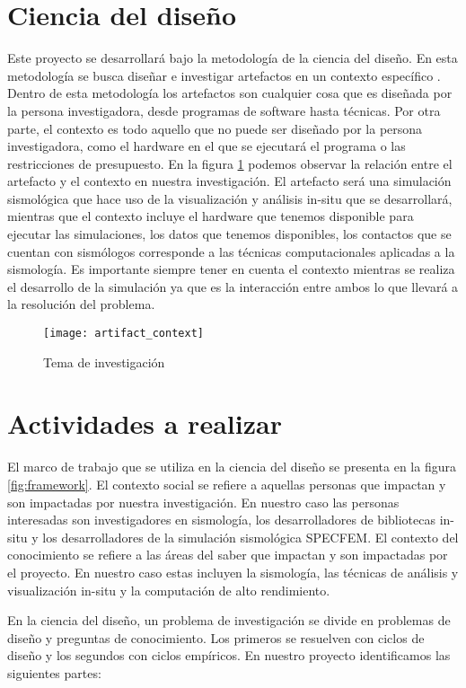 \section{Ciencia del diseño}
Este proyecto se desarrollará bajo la metodología de la ciencia del diseño. En esta metodología se busca diseñar e investigar artefactos en un contexto específico \cite{wieringa_design_2014}. Dentro de esta metodología los artefactos son cualquier cosa que es diseñada por la persona investigadora, desde programas de software hasta técnicas. Por otra parte, el contexto es todo aquello que no puede ser diseñado por la persona investigadora, como el hardware en el que se ejecutará el programa o las restricciones de presupuesto.
En la figura \ref{fig:artifact} podemos observar la relación entre el artefacto y el contexto en nuestra investigación. El artefacto será una simulación sismológica que hace uso de la visualización y análisis in-situ que se desarrollará, mientras que el contexto incluye el hardware que tenemos disponible para ejecutar las simulaciones, los datos que tenemos disponibles, los contactos que se cuentan con sismólogos corresponde a las técnicas computacionales aplicadas a la sismología. Es importante siempre tener en cuenta el contexto mientras se realiza el desarrollo de la simulación ya que es la interacción entre ambos lo que llevará a la resolución del problema.
\begin{figure}
  \centering
  \texttt{[image: artifact\_context]}
  \caption{Tema de investigación}
  \label{fig:artifact}
\end{figure}

\section{Actividades a realizar}
\label{sec:activities}

El marco de trabajo que se utiliza en la ciencia del diseño se presenta en la figura \ref{fig:framework}. El contexto social se refiere a aquellas personas que impactan y son impactadas por nuestra investigación. En nuestro caso las personas interesadas son investigadores en sismología, los desarrolladores de bibliotecas in-situ y los desarrolladores de la simulación sismológica SPECFEM. El contexto del conocimiento se refiere a las áreas del saber que impactan y son impactadas por el proyecto. En nuestro caso estas incluyen la sismología, las técnicas de análisis y visualización in-situ y la computación de alto rendimiento.

En la ciencia del diseño, un problema de investigación se divide en problemas de diseño y preguntas de conocimiento. Los primeros se resuelven con ciclos de diseño y los segundos con ciclos empíricos. En nuestro proyecto identificamos las siguientes partes:

